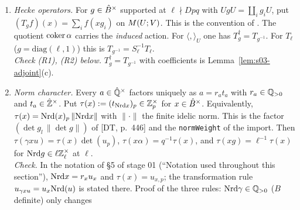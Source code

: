 \begin{enumerate}[label=(C\arabic*)]
  only if $-1\in U'$ or $-1\notin U$. Otherwise $\mathrm{tr}\circ\nu'=2\,\nu\circ\pi_*$. For the degeneracies $s_0,s_1$ of this stage the
  hypothesis \emph{always holds}: $U'=\Uzero qU$ differs from $U$ (and $\alpha^{-1}U'\alpha$ from $U$) only at $q$, and $-1\in\Iw_q$, so
  $-1\in U'\iff-1\in U$. The same holds for the unfolding identity used for $\varepsilon$ in Thm~\ref{thm:s03-iharaH0}: there the
  orbit sizes are $w_x/w_y=|\Gamma_x|/|\Gamma_y|$ (Lemma~\ref{lem:s03-unfold}). This stage never passes from $\hat\cO^\times$ to $\Uone N$. Any such level change
  (for example comparing $\Phicomb(\GDR_q(\Uone{Mp^s}))$ with level $1$, or in stage 04) must carry the factor $2$ explicitly whenever
  $-1\in U$ and $-1\notin U'$.\\
  \emph{Check.} The traces are stage 02's $\mathrm{tr}_0,\mathrm{tr}_1$ (Def.~\ref{def:s02-Mhom}(iv), whose factor $u_p$ is $1$ for representatives
  in $\GL_2(\Zq)$); $\nu\circ s_{j*}=\mathrm{tr}_j\circ\nu'$ is Prop.~\ref{prop:s02-Mhomprops}(d), and the factor-$2$ statement is
  Prop.~\ref{prop:s01-adjoint}(c). \stproved
\item \emph{Hecke operators.} For $g\in\hat{B}^\times$ supported at $\ell\nmid Dpq$ with $UgU=\coprod_ig_iU$, put
  $(T_gf)(x)=\sum_if(xg_i)$ on $M(U;V)$. This is the convention of . The quotient $\operatorname{coker}\alpha$ carries the
  \emph{induced} action. For $\langle,\rangle_U$ one has $T_g^\dagger=T_{g^{-1}}$. For $T_\ell$ ($g=\mathrm{diag}(\ell,1)$) this
  is $T_{g^{-1}}=S_\ell^{-1}T_\ell$.\\
  \emph{Check (R1), (R2) below.} $T_g^\dagger=T_{g^{-1}}$ with coefficients is Lemma~\ref{lem:s03-adjoint}(c). \stproved
\item \emph{Norm character.} Every $a\in\hat{\mathbb{Q}}^\times$ factors uniquely as $a=r_at_a$ with $r_a\in\mathbb{Q}_{>0}$ and
  $t_a\in\hat{\mathbb{Z}}^\times$. Put $\tau(x):=(t_{\mathrm{Nrd} x})_p\in\mathbb{Z}_p^\times$ for $x\in\hat{B}^\times$. Equivalently,
  $\tau(x)=\mathrm{Nrd}(x)_p\,\|\mathrm{Nrd} x\|$ with $\|\cdot\|$ the finite idelic norm. This is the factor $(\det g_l\,\|\det g\|)$ of [DT, p.~446]
  and the \texttt{normWeight} of the import. Then $\tau(\gamma xu)=\tau(x)\det(u_p)$, $\tau(x\alpha)=q^{-1}\tau(x)$, and
  $\tau(xg)=\ell^{-1}\tau(x)$ for $\mathrm{Nrd} g\in\ell\mathbb{Z}_\ell^\times$ at $\ell$.\\
  \emph{Check.} In the notation of \S5 of stage 01 (``Notation used throughout this section''), $\mathrm{Nrd} x=r_xu_x$ and $\tau(x)=u_{x,p}$; the
  transformation rule $u_{\gamma xu}=u_x\mathrm{Nrd}(u)$ is stated there. Proof of the three rules: $\mathrm{Nrd}\gamma\in\mathbb{Q}_{>0}$ ($B$ definite) only changes

\end{enumerate}
